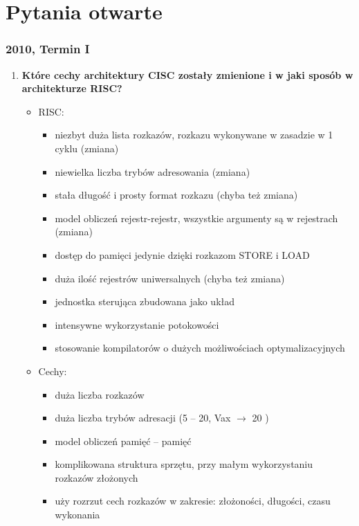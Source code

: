 
\newpage
\part{Pytania otwarte}
	\section{2010, Termin I}
		\begin{enumerate}
			\item \textbf{Które cechy architektury CISC zostały zmienione i w jaki sposób w architekturze RISC?}
			\begin{itemize}
				\item RISC:
				\begin{itemize}
					\item niezbyt duża lista rozkazów, rozkazu wykonywane w zasadzie w 1 cyklu (zmiana)
					\item  niewielka liczba trybów adresowania (zmiana)
					\item stała długość i prosty format rozkazu (chyba też zmiana)
					\item model obliczeń rejestr-rejestr, wszystkie argumenty są w rejestrach (zmiana) 
					\item dostęp do pamięci jedynie dzięki rozkazom STORE i LOAD
					\item duża ilość rejestrów uniwersalnych (chyba też zmiana)
					\item jednostka sterująca zbudowana jako układ
					\item intensywne wykorzystanie potokowości
					\item stosowanie kompilatorów o dużych możliwościach optymalizacyjnych
				\end{itemize}
				\item Cechy:
				\begin{itemize}
					\item duża liczba rozkazów
					\item duża liczba trybów adresacji (5 – 20, Vax $ \rightarrow $ 20 )
					\item model obliczeń pamięć – pamięć
					\item komplikowana struktura sprzętu, przy małym wykorzystaniu rozkazów złożonych
					\item uży rozrzut cech rozkazów w zakresie: złożoności, długości, czasu wykonania
				\end{itemize}
			\end{itemize}
			\label{itm:risc}
			

\end{enumerate}
